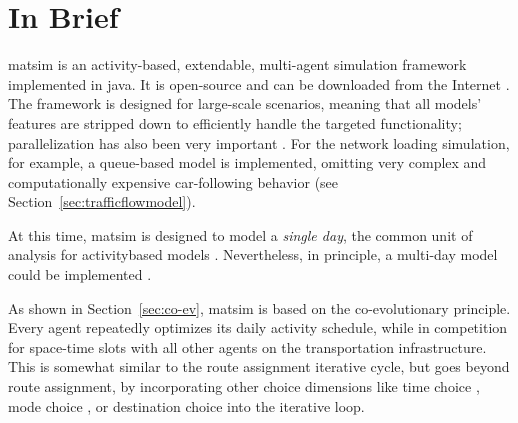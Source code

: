 \section{In Brief}
\label{sec:inbrief}
\gls{matsim} is an activity-based, extendable, multi-agent simulation \gls{framework} 
implemented in
\gls{java}. It is open-source and can be downloaded from the Internet \citep[][]{MATSIM_Webpage_2015, GitHub_Webpage_2015}. The \gls{framework} is 
designed for large-scale scenarios, meaning that all models' features are stripped down to efficiently handle the targeted functionality; parallelization has also been very important \citep[e.g.,][]{Dobler_TechRep_IVT_2011, Charypar_PhDThesis_2008}. For the network loading simulation, for example, a queue-based model is implemented, omitting very complex and computationally expensive car-following behavior (see Section~\ref{sec:trafficflowmodel}).

At this time, \gls{matsim} is 
%
designed to model a \emph{single day}, the common unit of analysis for \gls{activitybased} models \citep[see, for example, the review by][]{Bowman_TEC_2009_1}. 
Nevertheless, in principle, a 
multi-day model could be implemented \citep[][]{HorniEtAl_TechRep_IVT_2012_a}.

As shown in Section~\ref{sec:co-ev}, \gls{matsim} is based on the co-evolutionary principle. Every agent repeatedly optimizes its daily \gls{activity} schedule, while in  competition for space-time slots with all other agents on the transportation infrastructure.  This is somewhat similar to the route assignment iterative cycle, but goes beyond route assignment, by incorporating other choice dimensions like time choice \citep{BalmerRaneyEtAl2005act-times}, mode choice \citep{GretherEtAl2009SimpleModeChoiceIPL}, or destination choice %
\citep{HorniEtAl2011TrbLocationChoice}
into the iterative loop.

